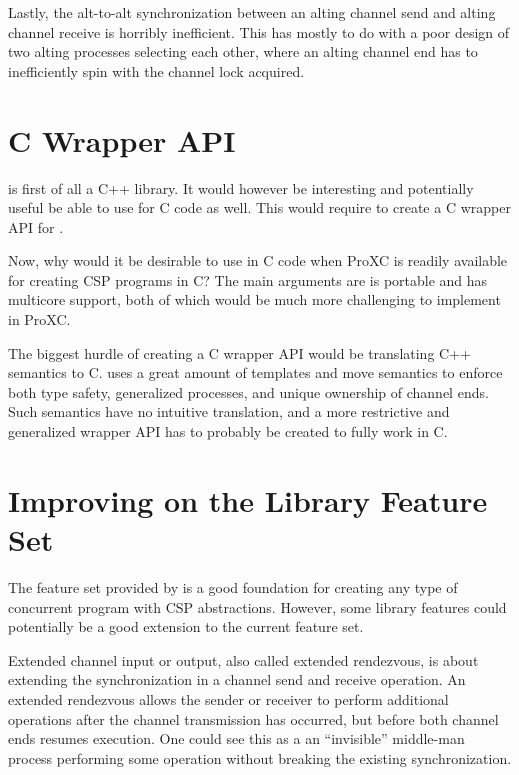 Lastly, the alt\hyp{}to\hyp{}alt synchronization between an alting channel send and alting channel receive is horribly inefficient. This has mostly to do with a poor design of two alting processes selecting each other, where an alting channel end has to inefficiently spin with the channel lock acquired.


\section{C Wrapper API}


\Proxc{} is first of all a C++ library. It would however be interesting and potentially useful be able to use \Proxc{} for C code as well. This would require to create a C wrapper API for \Proxc{}.

Now, why would it be desirable to use \Proxc{} in C code when ProXC is readily available for creating CSP programs in C? The main arguments are \Proxc{} is portable and has multicore support, both of which would be much more challenging to implement in ProXC.

The biggest hurdle of creating a C wrapper API would be translating C++ semantics to C. \Proxc{} uses a great amount of templates and move semantics to enforce both type safety, generalized processes, and unique ownership of channel ends. Such semantics have no intuitive translation, and a more restrictive and generalized wrapper API has to probably be created to fully work in C.


\section{Improving on the Library Feature Set}


The feature set provided by \Proxc{} is a good foundation for creating any type of concurrent program with CSP abstractions. However, some library features could potentially be a good extension to the current feature set.

Extended channel input or output, also called extended rendezvous, is about extending the synchronization in a channel send and receive operation. An extended rendezvous allows the sender or receiver to perform additional operations after the channel transmission has occurred, but before both channel ends resumes execution. One could see this as a an ``invisible'' middle\hyp{}man process performing some operation without breaking the existing synchronization.

